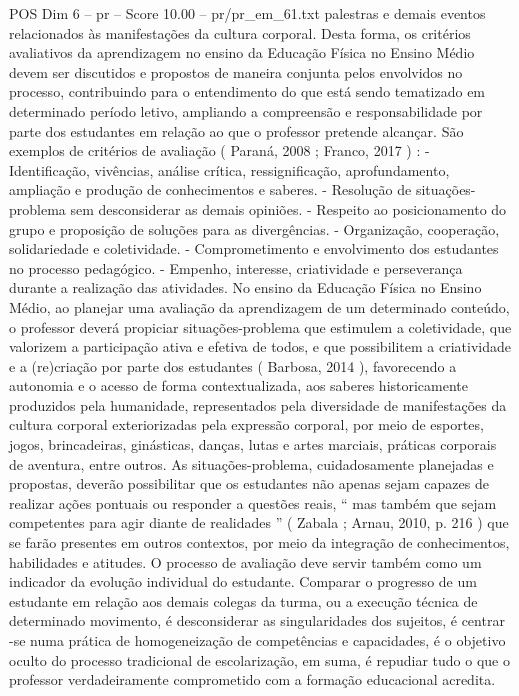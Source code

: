\begin{textsample}{POS Dim 6 – pr – Score 10.00 – pr/pr\_em\_61.txt}
palestras e demais eventos relacionados às manifestações da cultura corporal.
Desta forma, os critérios avaliativos da aprendizagem no ensino da Educação Física no Ensino Médio devem ser discutidos e propostos de maneira conjunta pelos envolvidos no processo, contribuindo para o entendimento do que está sendo tematizado em determinado período letivo, ampliando a compreensão e responsabilidade por parte dos estudantes em relação ao que o professor pretende alcançar.
São exemplos de critérios de avaliação ( Paraná, 2008 ; Franco, 2017 ) : - Identificação, vivências, análise crítica, ressignificação, aprofundamento, ampliação e produção de conhecimentos e saberes. - Resolução de situações-problema sem desconsiderar as demais opiniões. - Respeito ao posicionamento do grupo e proposição de soluções para as divergências. - Organização, cooperação, solidariedade e coletividade. - Comprometimento e envolvimento dos estudantes no processo pedagógico. - Empenho, interesse, criatividade e perseverança durante a realização das atividades.
No ensino da Educação Física no Ensino Médio, ao planejar uma avaliação da aprendizagem de um determinado conteúdo, o professor deverá propiciar situações-problema que estimulem a coletividade, que valorizem a participação ativa e efetiva de todos, e que possibilitem a criatividade e a (re)criação por parte dos estudantes ( Barbosa, 2014 ), favorecendo a autonomia e o acesso de forma contextualizada, aos saberes historicamente produzidos pela humanidade, representados pela diversidade de manifestações da cultura corporal exteriorizadas pela expressão corporal, por meio de esportes, jogos, brincadeiras, ginásticas, danças, lutas e artes marciais, práticas corporais de aventura, entre outros.
As situações-problema, cuidadosamente planejadas e propostas, deverão possibilitar que os estudantes não apenas sejam capazes de realizar ações pontuais ou responder a questões reais, “ mas também que sejam competentes para agir diante de realidades ” ( Zabala ; Arnau, 2010, p. 216 ) que se farão presentes em outros contextos, por meio da integração de conhecimentos, habilidades e atitudes.
O processo de avaliação deve servir também como um indicador da evolução individual do estudante.
Comparar o progresso de um estudante em relação aos demais colegas da turma, ou a execução técnica de determinado movimento, é desconsiderar as singularidades dos sujeitos, é centrar -se numa prática de homogeneização de competências e capacidades, é o objetivo oculto do processo tradicional de escolarização, em suma, é repudiar tudo o que o professor verdadeiramente comprometido com a formação educacional acredita.

\end{textsample}

